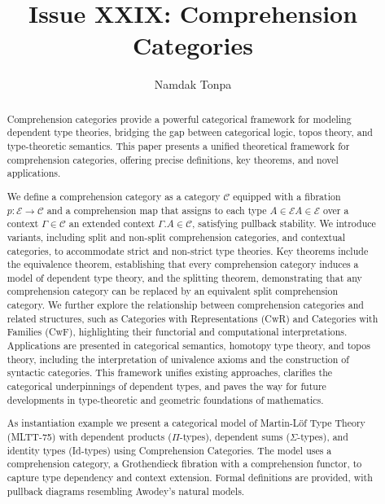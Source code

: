 \documentclass{article}
\begin{document}
\title{Issue XXIX: Comprehension Categories}
\author{Namdak Tonpa}
\date{}

\maketitle

\begin{abstract}
Comprehension categories provide a powerful categorical framework for modeling dependent
type theories, bridging the gap between categorical logic, topos theory, and type-theoretic
semantics. This paper presents a unified theoretical framework for comprehension categories,
offering precise definitions, key theorems, and novel applications.

We define a comprehension
category as a category $\mathcal{C}$
equipped with a fibration $p: \mathcal{E} \to \mathcal{C}$
and a comprehension map that assigns to each type $A \in \mathcal{E}A \in \mathcal{E}$
over a context $\Gamma \in \mathcal{C}$
an extended context $\Gamma.A \in \mathcal{C}$,
satisfying pullback stability. We introduce variants, including split and
non-split comprehension categories, and contextual categories, to accommodate
strict and non-strict type theories. Key theorems include the equivalence theorem,
establishing that every comprehension category induces a model of dependent type theory,
and the splitting theorem, demonstrating that any comprehension category can be replaced
by an equivalent split comprehension category. We further explore the relationship
between comprehension categories and related structures, such as Categories with
Representations (CwR) and Categories with Families (CwF), highlighting their
functorial and computational interpretations. Applications are presented in
categorical semantics, homotopy type theory, and topos theory, including the
interpretation of univalence axioms and the construction of syntactic categories.
This framework unifies existing approaches, clarifies the categorical
underpinnings of dependent types, and paves the way for future developments
in type-theoretic and geometric foundations of mathematics.

As instantiation example we present a categorical model of Martin-Löf Type Theory (MLTT-75)
with dependent products ($\Pi$-types), dependent sums ($\Sigma$-types),
and identity types (Id-types) using Comprehension Categories.
The model uses a comprehension category, a Grothendieck fibration
with a comprehension functor, to capture type dependency and context extension.
Formal definitions are provided, with pullback diagrams resembling Awodey’s natural models.
\end{abstract}
\end{document}
